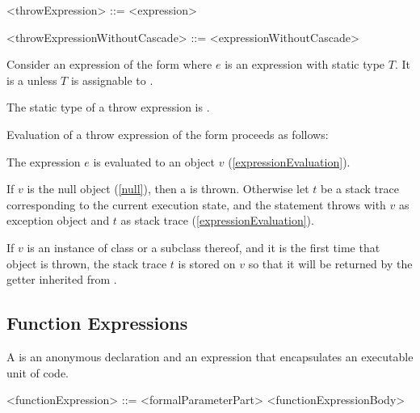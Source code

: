 \documentclass[makeidx]{article}
\begin{document}
{\begin{grammar}
<throwExpression> ::= \THROW{} <expression>

<throwExpressionWithoutCascade> ::= \THROW{} <expressionWithoutCascade>
\end{grammar}

\LMHash{}%
Consider an expression of the form 
where $e$ is an expression with static type $T$.
It is a  unless $T$ is assignable to .

\LMHash{}%
The static type of a throw expression is .

\LMHash{}%
Evaluation of a throw expression of the form 
proceeds as follows:

\LMHash{}%
The expression $e$ is evaluated to an object $v$
(\ref{expressionEvaluation}).


\LMHash{}%
If $v$ is the null object (\ref{null}), then a  is thrown.
Otherwise let $t$ be a stack trace corresponding to the current execution state,
and the \THROW{} statement throws with $v$ as exception object
and $t$ as stack trace (\ref{expressionEvaluation}).

\LMHash{}%
If $v$ is an instance of class  or a subclass thereof,
and it is the first time that  object is thrown,
the stack trace $t$ is stored on $v$ so that it will be returned
by the  getter inherited from .



\subsection{Function Expressions}

\LMHash{}%
A 
is an anonymous declaration and an expression
that encapsulates an executable unit of code.

\begin{grammar}
<functionExpression> ::= <formalParameterPart> <functionExpressionBody>


\end{grammar}}
\end{document}
